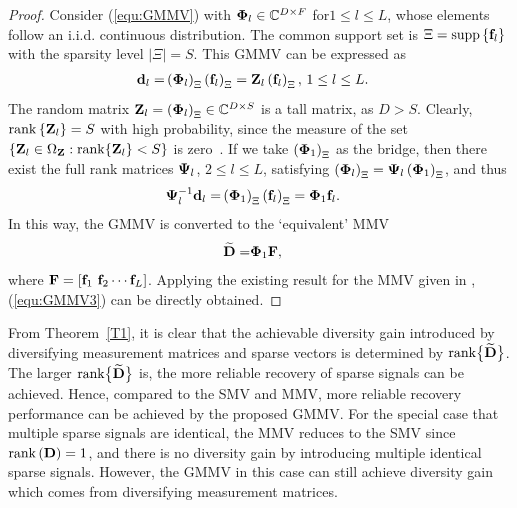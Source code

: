 \documentclass[final]{IEEEtran}
\begin{document}
\begin{proof}
 Consider (\ref{equ:GMMV}) with ${\bf{\Phi}}_l\in \mathbb{C}^{D\times F}$ for$1\le l\le L$,
 whose elements follow an i.i.d. continuous distribution. The common support set is
 $\Xi ={\rm{supp}}\left\{ {\bf f}_l \right\}$ with the sparsity level $\left| \Xi  \right|
 =S$. This GMMV can be expressed as
\begin{align}\label{aA1} %
 {\bf d}_l =& \left( {\bf{\Phi}}_l \right)_{\Xi} \left( {\bf f}_l \right)_{\Xi}
 = {\bf Z}_l \left( {\bf f}_l \right)_{\Xi} , \, 1\le l\le L.
\end{align}
 The random matrix ${\bf Z}_l=\left( {\bf{\Phi}}_l \right)_{\Xi}\in \mathbb{C}^{D\times S}$
 is a tall matrix, as $D > S$. Clearly, ${\rm{rank}}\left\{ {\bf Z}_l \right\}=S$ with high
 probability, since the measure of the set $\left\{ {\bf Z}_l\in \Omega_{\bf Z}:
 {\rm{rank}}\{{\bf Z}_l\} < S\right\}$ is zero~\cite{cedu}. If we take
 $\left({\bf{\Phi}}_1\right)_{\Xi}$ as the bridge, then there exist the full rank matrices
 ${\bf{\Psi}}_l$, $2\le l\le L$, satisfying $\left({\bf{\Phi}}_l\right)_{\Xi}= {\bf{\Psi}}_l
 \left({\bf{\Phi}}_1\right)_{\Xi}$, and thus
\begin{align} %
 {\bf{\Psi}}_l^{-1}{\bf d}_l =& \left( {\bf{\Phi}}_1 \right)_{\Xi}
 \left( {\bf f}_l \right)_{\Xi} = {{\bf{\Phi }}_1}{{\bf{f}}_l}.
\end{align}
 In this way, the GMMV is converted to the `equivalent' MMV
\begin{align}\label{aA3} %
 \widetilde{\bf D} =& {\bf{\Phi}}_1 {\bf F} ,
\end{align}
 where ${\bf F}=\left[ {\bf f}_1 ~ {\bf f}_2 \cdots {\bf f}_L \right]$. Applying the existing
 result for the MMV given in \cite{MMV-J}, (\ref{equ:GMMV3}) can be directly obtained.
\end{proof}

 From Theorem~\ref{T1}, it is clear that the achievable diversity gain introduced by
 diversifying measurement matrices and sparse vectors is determined by $\rm{rank}\big\{
 \widetilde{\bf D}\big\}$. The larger $\rm{rank}\big\{ \widetilde{\bf D}\big\}$ is, the
 more reliable recovery of sparse signals can be achieved. Hence, compared to the SMV and
 MMV, more reliable recovery performance can be achieved by the proposed GMMV. For the
 special case that multiple sparse signals are identical, the MMV reduces to the SMV
 since ${\rm rank}\left({\bf D}\right)=1$, and there is no diversity gain by introducing
 multiple identical sparse signals. However, the GMMV in this case can still achieve
 diversity gain which comes from diversifying measurement matrices.
\end{document}
